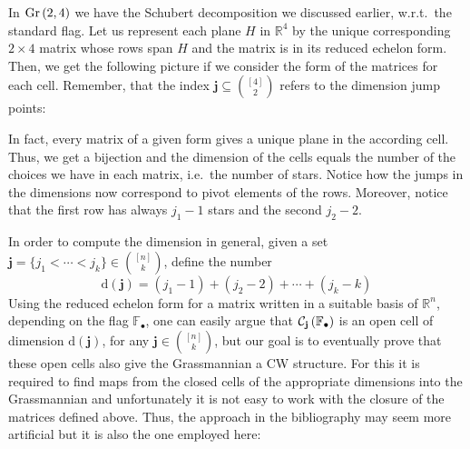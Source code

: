 \begin{example} In $\Gr{2}{4}$ we have the Schubert decomposition we discussed earlier, w.r.t.\ the standard flag. Let us represent each plane $H$ in $\mathbb{R}^4$ by the unique corresponding $2\times 4$ matrix whose rows span $H$ and the matrix is in its reduced echelon form. Then, we get the following picture if we consider the form of the matrices for each cell. Remember, that the index $\mathbf{j}\subseteq\binom{[4]}{2}$ refers to the dimension jump points:
\begin{center}
\end{center}
In fact, every matrix of a given form gives a unique plane in the according cell. Thus, we get a bijection and the dimension of the cells equals the number of the choices we have in each matrix, i.e.\ the number of stars. Notice how the jumps in the dimensions now correspond to pivot elements of the rows. Moreover, notice that the first row has always $j_1-1$ stars and the second $j_2-2$.
\end{example}

In order to compute the dimension in general, given a set $\mathbf{j}=\{j_1<\cdots<j_k\}\in\binom{[n]}{k}$, define the number
\[\mathrm{d}(\mathbf{j})=(j_1-1)+(j_2-2)+\cdots+(j_k-k)\]
Using the reduced echelon form for a matrix written in a suitable basis of $\mathbb{R}^n$, depending on the flag $\mathbb{F}_{\bullet}$, one can easily argue that $\mathcal{C}_{\mathbf{j}}\left(\mathbb{F}_{\bullet}\right)$ is an open cell of dimension $\mathrm{d}(\mathbf{j})$, for any $\mathbf{j}\in\binom{[n]}{k}$, but our goal is to eventually prove that these open cells also give the Grassmannian a CW structure. For this it is required to find maps from the closed cells of the appropriate dimensions into the Grassmannian and unfortunately it is not easy to work with the closure of the matrices defined above. Thus, the approach in the bibliography may seem more artificial but it is also the one employed here:

